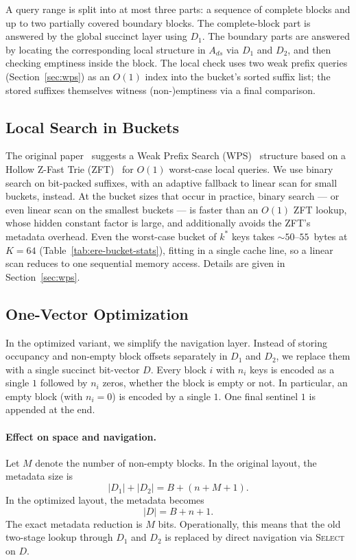 A query range is split into at most three parts: a sequence of complete blocks
and up to two partially covered boundary blocks.
The complete-block part is answered by the global succinct layer using $D_1$.
The boundary parts are answered by locating the corresponding local
structure in $A_{ds}$ via $D_1$ and $D_2$, and then checking emptiness
inside the block.
The local check uses two weak prefix queries (Section~\ref{sec:wps})
as an $O(1)$ index into the bucket's sorted suffix list; the stored
suffixes themselves witness (non-)emptiness via a final comparison.

\subsection{Local Search in Buckets}
\label{subsec:ere-local-search}

The original paper~\citep{goswami2015approximate} suggests a Weak Prefix Search
(WPS)~\citep{belazzougui2010fast} structure based on a Hollow Z-Fast Trie
(ZFT)~\citep{belazzougui2010fast} for $O(1)$ worst-case local queries.
We use binary search on bit-packed suffixes, with an adaptive fallback to linear scan for small buckets, instead.
At the bucket sizes that occur in practice, binary search --- or even
linear scan on the smallest buckets --- is faster than an $O(1)$ ZFT
lookup, whose hidden constant factor is large, and additionally avoids
the ZFT's metadata overhead.
Even the worst-case bucket of $k^*$ keys takes ${\sim}50$--$55$~bytes
at $K = 64$ (Table~\ref{tab:ere-bucket-stats}), fitting in a single
cache line, so a linear scan reduces to one sequential memory access.
Details are given in Section~\ref{sec:wps}.

\subsection{One-Vector Optimization}
\label{subsec:ere-one-vector}

In the optimized variant, we simplify the navigation layer.
Instead of storing occupancy and non-empty block offsets separately in $D_1$ and $D_2$, we replace them with a single succinct bit-vector $D$.
Every block $i$ with $n_i$ keys is encoded as a single $1$ followed by $n_i$ zeros, whether the block is empty or not.
In particular, an empty block (with $n_i = 0$) is encoded by a single $1$.
One final sentinel $1$ is appended at the end.

\paragraph{Effect on space and navigation.}
Let $M$ denote the number of non-empty blocks.
In the original layout, the metadata size is
\[
    |D_1| + |D_2| = B + (n + M + 1).
\]
In the optimized layout, the metadata becomes
\[
    |D| = B + n + 1.
\]
The exact metadata reduction is $M$ bits.
Operationally, this means that the old two-stage lookup through $D_1$
and $D_2$ is replaced by direct navigation via \textsc{Select} on $D$.

